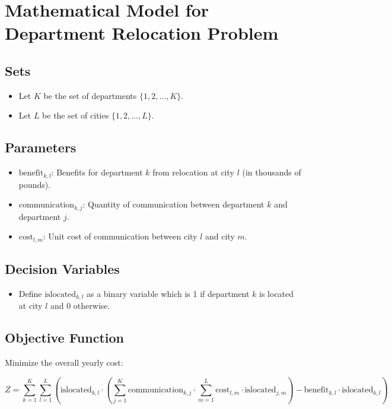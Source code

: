 \documentclass{article}
\begin{document}
\section*{Mathematical Model for Department Relocation Problem}

\subsection*{Sets}
\begin{itemize}
    \item Let \( K \) be the set of departments \( \{1, 2, \ldots, K\} \).
    \item Let \( L \) be the set of cities \( \{1, 2, \ldots, L\} \).
\end{itemize}

\subsection*{Parameters}
\begin{itemize}
    \item \( \text{benefit}_{k, l} \): Benefits for department \( k \) from relocation at city \( l \) (in thousands of pounds).
    \item \( \text{communication}_{k, j} \): Quantity of communication between department \( k \) and department \( j \).
    \item \( \text{cost}_{l, m} \): Unit cost of communication between city \( l \) and city \( m \).
\end{itemize}

\subsection*{Decision Variables}
\begin{itemize}
    \item Define \( \text{islocated}_{k, l} \) as a binary variable which is 1 if department \( k \) is located at city \( l \) and 0 otherwise.
\end{itemize}

\subsection*{Objective Function}
Minimize the overall yearly cost:

\[
Z = \sum_{k=1}^{K} \sum_{l=1}^{L} \left( \text{islocated}_{k, l} \cdot \left( \sum_{j=1}^{K} \text{communication}_{k, j} \cdot \sum_{m=1}^{L} \text{cost}_{l, m} \cdot \text{islocated}_{j, m} \right) - \text{benefit}_{k, l} \cdot \text{islocated}_{k, l} \right)
\]
\end{document}
